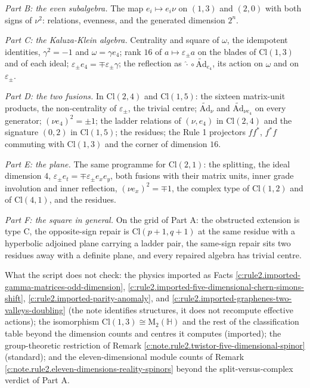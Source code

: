 \documentclass[11pt]{article}
\theoremstyle{definition}
\theoremstyle{plain}
\providecommand{\Ad}{}\renewcommand{\Ad}{\widetilde{\mathrm{Ad}}}
\providecommand{\Cl}{}\renewcommand{\Cl}{\mathrm{Cl}}
\providecommand{\HH}{}\renewcommand{\HH}{\mathbb{H}}
\providecommand{\Mat}{}\renewcommand{\Mat}{\mathrm{M}}
\begin{document}
\emph{Part B: the even subalgebra.} The map $e_i \mapsto e_i\nu$ on $(1,3)$ and $(2,0)$ with both signs of $\nu^2$: relations, evenness, and the generated dimension $2^n$.

\emph{Part C: the Kaluza-Klein algebra.} Centrality and square of $\omega$, the idempotent identities, $\gamma^2 = -1$ and $\omega = \gamma e_4$; rank $16$ of $a \mapsto \varepsilon_\pm a$ on the blades of $\Cl(1,3)$ and of each ideal; $\varepsilon_\pm e_4 = \mp\varepsilon_\pm\gamma$; the reflection as $\hat{\cdot}\circ\Ad_{e_4}$, its action on $\omega$ and on $\varepsilon_\pm$.

\emph{Part D: the two fusions.} In $\Cl(2,4)$ and $\Cl(1,5)$: the sixteen matrix-unit products, the non-centrality of $\varepsilon_\pm$, the trivial centre; $\Ad_\nu$ and $\Ad_{\nu e_4}$ on every generator; $(\nu e_4)^2 = \pm 1$; the ladder relations of $(\nu, e_4)$ in $\Cl(2,4)$ and the signature $(0,2)$ in $\Cl(1,5)$; the residues; the Rule 1 projectors $ff^*$, $f^*f$ commuting with $\Cl(1,3)$ and the corner of dimension $16$.

\emph{Part E: the plane.} The same programme for $\Cl(2,1)$: the splitting, the ideal dimension $4$, $\varepsilon_\pm e_t = \mp\varepsilon_\pm e_xe_y$, both fusions with their matrix units, inner grade involution and inner reflection, $(\nu e_x)^2 = \mp 1$, the complex type of $\Cl(1,2)$ and of $\Cl(4,1)$, and the residues.

\emph{Part F: the square in general.} On the grid of Part A: the obstructed extension is type C, the opposite-sign repair is $\Cl(p{+}1,q{+}1)$ at the same residue with a hyperbolic adjoined plane carrying a ladder pair, the same-sign repair sits two residues away with a definite plane, and every repaired algebra has trivial centre.

What the script does not check: the physics imported as Facts \ref{c:rule2.imported-gamma-matrices-odd-dimension}, \ref{c:rule2.imported-five-dimensional-chern-simons-shift}, \ref{c:rule2.imported-parity-anomaly}, and \ref{c:rule2.imported-graphenes-two-valleys-doubling} (the note identifies structures, it does not recompute effective actions); the isomorphism $\Cl(1,3) \cong \Mat_2(\HH)$ and the rest of the classification table beyond the dimension counts and centres it computes (imported); the group-theoretic restriction of Remark \ref{c:note.rule2.twistor-five-dimensional-spinor} (standard); and the eleven-dimensional module counts of Remark \ref{c:note.rule2.eleven-dimensions-reality-spinors} beyond the split-versus-complex verdict of Part A.
\end{document}
